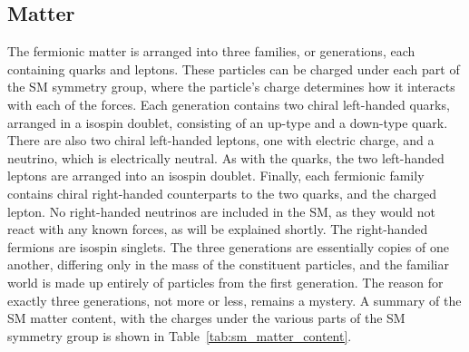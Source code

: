 \subsection{Matter}
\label{sec:matter}

The fermionic matter is arranged into three families, or generations, each
containing quarks and leptons.
These particles can be charged under each part of the SM symmetry group,
where the particle's charge determines how it interacts with each of the
forces.
Each generation contains two chiral left-handed quarks, arranged in a isospin
doublet, consisting of an up-type and a down-type quark.
There are also two chiral left-handed leptons, one with electric charge, and
a neutrino, which is electrically neutral.
As with the quarks, the two left-handed leptons are arranged into an isospin
doublet.
Finally, each fermionic family contains chiral right-handed counterparts to
the two quarks, and the charged lepton.
No right-handed neutrinos are included in the SM, as they would not react with
any known forces, as will be explained shortly.
The right-handed fermions are isospin singlets.
The three generations are essentially copies of one another, differing only in
the mass of the constituent particles, and the familiar world is made up
entirely of particles from the first generation.
The reason for exactly three generations, not more or less, remains a mystery.
A summary of the SM matter content, with the charges under the various
parts of the SM symmetry group is shown in Table~\ref{tab:sm_matter_content}.

